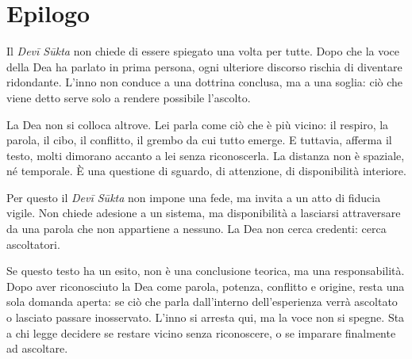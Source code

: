 \chapter*{Epilogo}

Il \textit{Devī Sūkta} non chiede di essere spiegato una volta per tutte. Dopo che la voce della Dea ha parlato in prima persona, ogni ulteriore discorso rischia di diventare ridondante. L’inno non conduce a una dottrina conclusa, ma a una soglia: ciò che viene detto serve solo a rendere possibile l’ascolto.

La Dea non si colloca altrove. Lei parla come ciò che è più vicino: il respiro, la parola, il cibo, il conflitto, il grembo da cui tutto emerge. E tuttavia, afferma il testo, molti dimorano accanto a lei senza riconoscerla. La distanza non è spaziale, né temporale. È una questione di sguardo, di attenzione, di disponibilità interiore.

Per questo il \textit{Devī Sūkta} non impone una fede, ma invita a un atto di fiducia vigile. Non chiede adesione a un sistema, ma disponibilità a lasciarsi attraversare da una parola che non appartiene a nessuno. La Dea non cerca credenti: cerca ascoltatori.

Se questo testo ha un esito, non è una conclusione teorica, ma una responsabilità. Dopo aver riconosciuto la Dea come parola, potenza, conflitto e origine, resta una sola domanda aperta: se ciò che parla dall’interno dell’esperienza verrà ascoltato o lasciato passare inosservato. L’inno si arresta qui, ma la voce non si spegne. Sta a chi legge decidere se restare vicino senza riconoscere, o se imparare finalmente ad ascoltare.